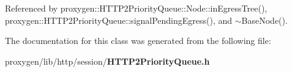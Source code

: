 Referenced by proxygen\+::\+H\+T\+T\+P2\+Priority\+Queue\+::\+Node\+::in\+Egress\+Tree(), proxygen\+::\+H\+T\+T\+P2\+Priority\+Queue\+::signal\+Pending\+Egress(), and $\sim$\+Base\+Node().



The documentation for this class was generated from the following file\+:\begin{DoxyCompactItemize}
\item 
proxygen/lib/http/session/{\bf H\+T\+T\+P2\+Priority\+Queue.\+h}\end{DoxyCompactItemize}
